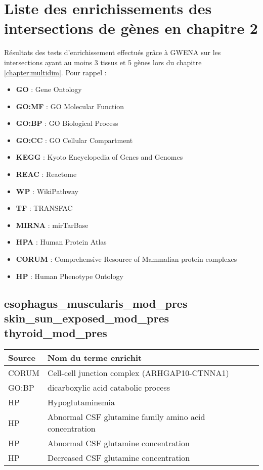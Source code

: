 \chapter{Liste des enrichissements des intersections de gènes en chapitre 2}
\label{annexe:chap_2_genes_intersect_enrichments}

Résultats des tests d'enrichissement effectués grâce à GWENA sur les intersections ayant au moins 3 tissus et 5 gènes lors du chapitre \ref{chapter:multidim}. Pour rappel :
\begin{itemize}
    \item{\textbf{GO} : Gene Ontology}
    \item{\textbf{GO:MF} : GO Molecular Function}
    \item{\textbf{GO:BP} : GO Biological Process}
    \item{\textbf{GO:CC} : GO Cellular Compartment}
    \item{\textbf{KEGG} : Kyoto Encyclopedia of Genes and Genomes}
    \item{\textbf{REAC} : Reactome}
    \item{\textbf{WP} : WikiPathway}
    \item{\textbf{TF} : TRANSFAC}
    \item{\textbf{MIRNA} : mirTarBase}
    \item{\textbf{HPA} : Human Protein Atlas}
    \item{\textbf{CORUM} : Comprehensive Resource of Mammalian protein complexes}
    \item{\textbf{HP} : Human Phenotype Ontology}
\end{itemize}


\section*{esophagus\_muscularis\_mod\_pres \newline skin\_sun\_exposed\_mod\_pres \newline thyroid\_mod\_pres}

\begin{longtable}{ll}
\toprule
Source & Nom du terme enrichit\\
\midrule
CORUM & Cell-cell junction complex (ARHGAP10-CTNNA1)\\
GO:BP & dicarboxylic acid catabolic process\\
HP & Hypoglutaminemia\\
HP & Abnormal CSF glutamine family amino acid concentration\\
HP & Abnormal CSF glutamine concentration\\
HP & Decreased CSF glutamine concentration\\
\bottomrule
\end{longtable}

